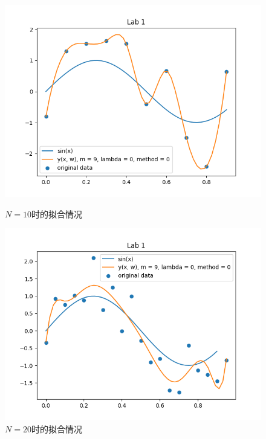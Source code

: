 \begin{figure}
    \begin{minipage}[t]{0.5\linewidth}
        \centering
        \includegraphics[width=\textwidth]{figures/Figure_5.png}
        \caption{$N = 10$时的拟合情况}
        \label{N10}
    \end{minipage}
    \begin{minipage}[t]{0.5\linewidth}
        \centering
        \includegraphics[width=\textwidth]{figures/Figure_6.png}
        \caption{$N = 20$时的拟合情况}
        \label{N20}
    \end{minipage}
\end{figure}

